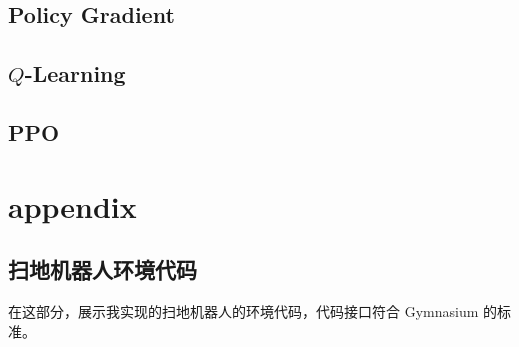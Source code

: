 \documentclass[citestyle=gb7714-2015, bibstyle=gb7714-2015,lang=cn,14pt,scheme=chinese]{elegantbook}
\begin{document}
\section{Policy Gradient}

\section{\(Q\)-Learning}

\section{PPO}



\nocite{*}

\printbibliography[heading=bibintoc, title=\ebibname]
\appendix

\chapter{appendix}

\section{扫地机器人环境代码}\label{sec:sweeping-robot-env}

在这部分，展示我实现的扫地机器人的环境代码，代码接口符合 Gymnasium 的标准。
\end{document}
